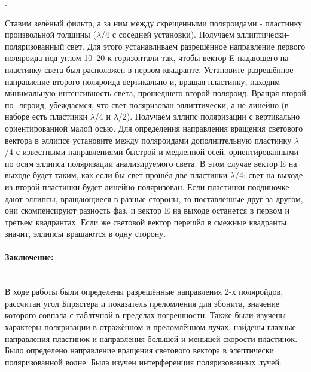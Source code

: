 \documentclass[a4paper, 12pt]{article}
\newcommand{\parag}[1]{\paragraph*{#1:}}
\newcounter{Points}
\newcommand{\point}{\arabic{Points}. \addtocounter{Points}{1}}
\begin{document}
\point Ставим зелёный фильтр, а за ним между скрещенными поляроидами - пластинку произвольной толщины ($\lambda$/4 с соседней установки).
Получаем эллиптически-поляризованный свет. Для этого устанавливаем
разрешённое направление первого поляроида под углом 10–20 к горизонтали 
так, чтобы вектор E падающего на пластинку света был расположен 
в первом квадранте. Установите разрешённое направление второго 
поляроида вертикально и, вращая пластинку, находим минимальную
интенсивность света, прошедшего второй поляроид. Вращая второй по-
ляроид, убеждаемся, что свет поляризован эллиптически, а не линейно
(в наборе есть пластинки $\lambda$/4 и $\lambda$/2). Получаем 
эллипс поляризации с вертикально ориентированной малой осью.
Для определения направления вращения светового вектора в эллипсе
установите между поляроидами дополнительную пластинку $\lambda$/4 с 
известными направлениями быстрой и медленной осей, ориентированными 
по осям эллипса поляризации анализируемого света. В этом
случае вектор E на выходе будет таким, как если бы свет прошёл две
пластинки $\lambda$/4: свет на выходе из второй пластинки будет линейно 
поляризован. Если пластинки поодиночке дают эллипсы, вращающиеся в
разные стороны, то поставленные друг за другом, они скомпенсируют
разность фаз, и вектор E на выходе останется в первом и третьем 
квадрантах. Если же световой вектор перешёл в смежные квадранты, значит,
эллипсы вращаются в одну сторону.

\parag {Заключение} ~\\
В ходе работы были определены разрешённые направления 2-х поляройдов,
рассчитан угол Бпрястера и показатель преломления для эбонита,
значение которого совпала с таблтчной в пределах погрешности. Также были изучены характеры поляризации
в отражённом и преломлённом лучах, найдены главные направления пластинок и направления большей
и меньшей скорости пластинок. Было определено направление вращения светового вектора в 
элептически поляризованной волне. Была изучен интерференция поляризованных
лучей.  
\end{document}
